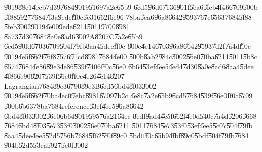 \documentclass[12pt,a4paper]{article}
\begin{document}
\bigskip

\U{9019}\U{88e1}\U{4ecb}\U{7d39}\U{7684}\U{9019}\U{5169}\U{7a2e}\U{65b9}%
\U{6cd5}\U{96d6}\U{7136}\U{901f}\U{5ea6}\U{5feb}\U{4f46}\U{6709}\U{500b}%
\U{5f88}\U{5927}\U{7684}\U{7f3a}\U{9ede}\U{ff0c}\U{5c31}\U{662f}\U{6e96}%
\U{78ba}\U{5ea6}\U{96a8}\U{6642}\U{9593}\U{767c}\U{6563}\U{7684}\U{5f88}%
\U{5feb}\U{3002}\U{9019}\U{4e00}\U{9ede}\U{6211}\U{5011}\U{9700}\U{8981}%
\U{8a73}\U{7d30}\U{7684}\U{8a0e}\U{8ad6}\U{3002}A\U{8207}C\U{7a2e}\U{65b9}%
\U{6cd5}\U{90fd}\U{6703}\U{6709}\U{504f}\U{79fb}\U{8aa4}\U{5dee}\U{ff0c}%
\U{800c}\U{4e14}\U{6703}\U{96a8}\U{6642}\U{9593}\U{7d2f}\U{7a4d}\U{ff0c}%
\U{9019}\U{4e5f}\U{662f}\U{76f8}\U{7576}\U{91cd}\U{8981}\U{7684}\U{4e00}%
\U{500b}\U{8ab2}\U{984c}\U{3002}\U{56e0}\U{70ba}\U{6211}\U{5011}\U{5b8c}%
\U{6574}\U{7684}\U{4e86}\U{89e3}\U{4e86}\U{539f}\U{7406}\U{ff0c}\U{56e0}%
\U{6b64}\U{53ef}\U{4ee5}\U{4ed4}\U{7d30}\U{8a0e}\U{8ad6}\U{8aa4}\U{5dee}%
\U{4f86}\U{6e90}\U{8207}\U{539f}\U{56e0}\U{ff0c}\U{4e26}\U{4e14}\U{8207}%
Lagrangian\U{7684}\U{89e3}\U{6790}\U{89e3}B\U{6cd5}\U{6bd4}\U{8f03}\U{3002}%
\U{9019}\U{4e5f}\U{662f}\U{70ba}\U{4ec0}\U{9ebc}\U{8981}\U{6709}\U{7b2c}%
\U{4e8c}\U{7a2e}\U{65b9}\U{6cd5}\U{7684}\U{539f}\U{56e0}\U{ff0c}\U{6709}%
\U{500b}\U{6b63}\U{78ba}\U{7684}reference\U{53ef}\U{4ee5}\U{96a8}\U{6642}%
\U{6bd4}\U{8f03}\U{3002}\U{56e0}\U{6b64}\U{9019}\U{5957}\U{6a21}\U{64ec}%
\U{8edf}\U{9ad4}\U{4e5f}\U{662f}\U{4e0d}\U{540c}\U{7a4d}\U{5206}\U{5668}%
\U{7684}\U{6bd4}\U{8f03}\U{5e73}\U{53f0}\U{3002}\U{56e0}\U{70ba}\U{6211}%
\U{5011}\U{7684}\U{5e73}\U{53f0}\U{53ef}\U{4ee5}\U{5c07}\U{504f}\U{79fb}%
\U{8aa4}\U{5dee}\U{4ee5}\U{52d5}\U{756b}\U{7684}\U{5f62}\U{5f0f}\U{89c0}%
\U{5bdf}\U{ff0c}\U{65b9}\U{4fbf}\U{89c0}\U{5bdf}\U{504f}\U{79fb}\U{7684}%
\U{904b}\U{52d5}\U{53ca}\U{5927}\U{5c0f}\U{3002}

\bigskip
\end{document}
